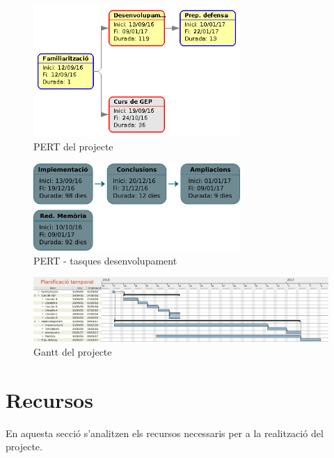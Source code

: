 		\begin{figure}[H]
			\centering
			\includegraphics[width=0.7\textwidth]{images/pert-global}
			\caption{PERT del projecte}
		\end{figure}
		\vspace{0.8cm}
		\begin{figure}[H]
			\centering
			\includegraphics[width=0.7\textwidth]{images/tasques}
			\caption{PERT - tasques desenvolupament}
		\end{figure}

		\restoregeometry
		\thispagestyle{empty}
		\begin{figure}
			\includegraphics[width=\textheight]{images/gantt}
			\caption{Gantt del projecte}
		\end{figure}
		\restoregeometry

\section{Recursos}
	En aquesta secció s'analitzen els recursos necessaris per a la realització del projecte. %
